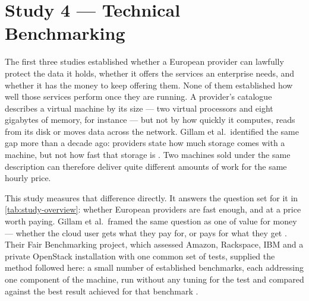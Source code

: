 \section{Study 4 --- Technical Benchmarking}
\label{sec:method-study4}


The first three studies established whether a European provider can lawfully
protect the data it holds, whether it offers the services an enterprise needs,
and whether it has the money to keep offering them. None of them established how
well those services perform once they are running. A provider's catalogue
describes a virtual machine by its size --- two virtual processors and eight
gigabytes of memory, for instance --- but not by how quickly it computes, reads
from its disk or moves data across the network. Gillam et al.\ identified the
same gap more than a decade ago: providers state how much storage comes with a
machine, but not how fast that storage is \cite{Gillam_FairBenchmarking_2013}.
Two machines sold under the same description can therefore deliver quite
different amounts of work for the same hourly price.

This study measures that difference directly. It answers the question set for it
in \cref{tab:study-overview}: whether European providers are fast enough, and at
a price worth paying. Gillam et al.\ framed the same question as one of value for
money --- whether the cloud user gets what they pay for, or pays for what they
get \cite{Gillam_FairBenchmarking_2013}. Their Fair Benchmarking project, which
assessed Amazon, Rackspace, IBM and a private OpenStack installation with one
common set of tests, supplied the method followed here: a small number of
established benchmarks, each addressing one component of the machine, run
without any tuning for the test and compared against the best result achieved
for that benchmark \cite{Gillam_FairBenchmarking_2013}.


